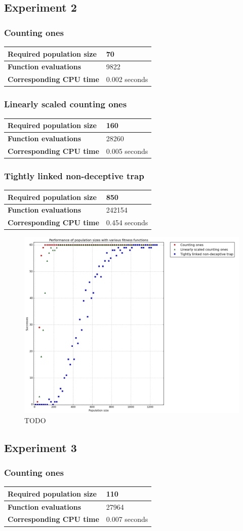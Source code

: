 \documentclass[12pt]{article}
\theoremstyle{definition}
\newcommand{\mytable}[3]{
\begin{table}[H]
\begin{tabular}{|ll|}
\hline
\textbf{Required population size} & #1            \\ \hline
\textbf{Function evaluations}     & #2            \\ \hline
\textbf{Corresponding CPU time}   & #3 seconds    \\ \hline
\end{tabular}
\end{table}
}
\begin{document}
\subsection*{Experiment 2}

\subsubsection*{Counting ones}
\mytable{70}{9822}{0.002}

\subsubsection*{Linearly scaled counting ones}
\mytable{160}{28260}{0.005}

\subsubsection*{Tightly linked non-deceptive trap}
\mytable{850}{242154}{0.454}


\begin{figure}[H]
    \centering
    \includegraphics[width=1\linewidth]{images/exp2.png}
    \caption{TODO}
\label{fig:exp2}
\end{figure}


\subsection*{Experiment 3}

\subsubsection*{Counting ones}
\mytable{110}{27964}{0.007}
\end{document}
